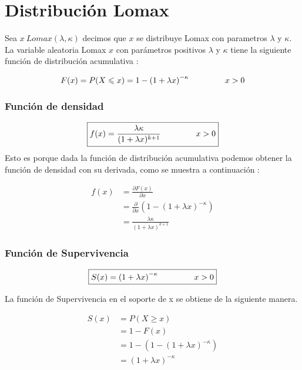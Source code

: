 \documentclass[10pt,a4paper]{article}
\begin{document}
\section{Distribuci\'on Lomax}
Sea $ x ~ Lomax(\lambda,\kappa) $ decimos que $x$ se distribuye Lomax con parametros $\lambda$ y $\kappa$. La variable aleatoria Lomax $x$ con parámetros positivos $\lambda$ y $\kappa$ tiene la siguiente función de distribución acumulativa :

\begin{equation*}
	F(x) = P(X \leqslant x) = 1 -  \left( 1 + \lambda x \right) ^ {-\kappa} \hspace{1.5cm} x>0
\end{equation*}

\subsubsection*{Funci\'on de densidad}

\begin{equation*}
\boxed{
f(x) = \frac{\lambda \kappa}{ (1+ \lambda x)^{k+1}} \hspace{1.5cm} x > 0}
\end{equation*}
Esto es porque dada la función de distribución acumulativa podemos obtener la función de densidad con su derivada, como se muestra a continuación : 

\begin{align*}
f(x) &= \frac{\partial F(x)}{\partial x}	 \\
	&=	\frac{\partial}{\partial x} \left(   1 -  \left( 1 + \lambda x \right) ^ {-\kappa} \right)\\
	&= \frac{\lambda \kappa}{ (1+ \lambda x)^{k+1}}
\end{align*} 


\subsubsection*{Funci\'on de Supervivencia}
\begin{equation*}
\boxed{
S(x) = \left( 1 + \lambda x \right) ^ {-\kappa} \hspace{1.5cm} x > 0}
\end{equation*}

La función de Supervivencia en el soporte de x se obtiene de la siguiente manera.

\begin{align*}
S(x) &= P(X \geqslant x) \\
     &= 1 - F(x) \\
     &= 1 - \left(1- \left( 1 + \lambda x \right) ^ {-\kappa} \right)  \\
     &= \left( 1 + \lambda x \right) ^ {-\kappa}
\end{align*}
\end{document}
